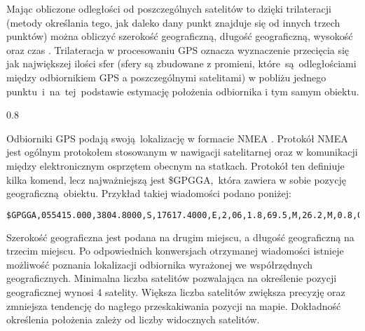 {{        Mając obliczone odległości od poszczególnych satelitów to dzięki trilateracji (metody określania tego, jak daleko dany punkt znajduje się od innych trzech punktów) można obliczyć szerokość geograficzną, długość geograficzną, wysokość oraz czas \cite{trilateration}. Trilateracja w procesowaniu GPS oznacza wyznaczenie przecięcia się jak największej ilości sfer (sfery są zbudowane z promieni, które~są~odległościami między odbiornikiem GPS a poszczególnymi satelitami) w pobliżu jednego punktu~i~na~tej~podstawie estymację położenia odbiornika i tym samym obiektu.
        
        \vspace{5mm}
         {0.8}{\cite{gps_sat_pic}}
        \vspace{5mm}
        
        Odbiorniki GPS podają swoją lokalizację w formacie NMEA \cite{nmea}. Protokół NMEA jest ogólnym protokołem stosowanym w nawigacji satelitarnej oraz w komunikacji między elektronicznym osprzętem obecnym na statkach. Protokół ten definiuje kilka komend, lecz najważniejszą jest \$GPGGA,~która zawiera w sobie pozycję geograficzną obiektu. Przykład takiej wiadomości podano poniżej:
        
        
        \begin{lstlisting}[language=xml]
            $GPGGA,055415.000,3804.8000,S,17617.4000,E,2,06,1.8,69.5,M,26.2,M,0.8,0000*54
         \end{lstlisting}

        Szerokość geograficzna jest podana na drugim miejscu, a długość geograficzną na trzecim miejscu. Po odpowiednich konwersjach otrzymanej wiadomości istnieje możliwość  poznania lokalizacji odbiornika wyrażonej we współrzędnych geograficznych. Minimalna liczba satelitów pozwalająca na określenie pozycji geograficznej wynosi 4 satelity. Większa liczba satelitów zwiększa precyzję oraz zmniejsza tendencję do nagłego przeskakiwania pozycji na mapie. Dokładność określenia położenia zależy od liczby widocznych satelitów.
    }
    \newpage
}

